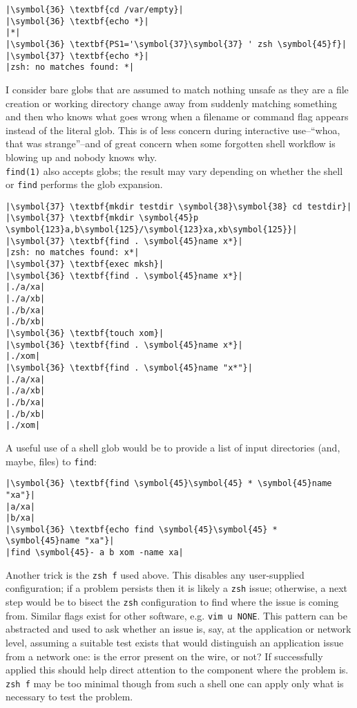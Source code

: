 \documentclass[10pt,a4paper]{article}
\begin{document}
\begin{lstlisting}
|\symbol{36} \textbf{cd /var/empty}|
|\symbol{36} \textbf{echo *}|
|*|
|\symbol{36} \textbf{PS1='\symbol{37}\symbol{37} ' zsh \symbol{45}f}|
|\symbol{37} \textbf{echo *}|
|zsh: no matches found: *|
\end{lstlisting}
 
I consider bare globs that are assumed to match nothing unsafe as they
are a file creation or working directory change away from suddenly
matching something and then who knows what goes wrong when a filename or
command flag appears instead of the literal glob. This is of less
concern during interactive use--``whoa, that was strange''--and of great
concern when some forgotten shell workflow is blowing up and nobody
knows why. \\

\texttt{find(1)} also accepts globs; the result may vary depending on
whether the shell or \texttt{find} performs the glob expansion.

\begin{lstlisting}
|\symbol{37} \textbf{mkdir testdir \symbol{38}\symbol{38} cd testdir}|
|\symbol{37} \textbf{mkdir \symbol{45}p \symbol{123}a,b\symbol{125}/\symbol{123}xa,xb\symbol{125}}|
|\symbol{37} \textbf{find . \symbol{45}name x*}|
|zsh: no matches found: x*|
|\symbol{37} \textbf{exec mksh}|
|\symbol{36} \textbf{find . \symbol{45}name x*}|
|./a/xa|
|./a/xb|
|./b/xa|
|./b/xb|
|\symbol{36} \textbf{touch xom}|
|\symbol{36} \textbf{find . \symbol{45}name x*}|
|./xom|
|\symbol{36} \textbf{find . \symbol{45}name "x*"}|
|./a/xa|
|./a/xb|
|./b/xa|
|./b/xb|
|./xom|
\end{lstlisting}

A useful use of a shell glob would be to provide a list of input
directories (and, maybe, files) to \texttt{find}:

\begin{lstlisting}
|\symbol{36} \textbf{find \symbol{45}\symbol{45} * \symbol{45}name "xa"}|
|a/xa|
|b/xa|
|\symbol{36} \textbf{echo find \symbol{45}\symbol{45} * \symbol{45}name "xa"}|
|find \symbol{45}- a b xom -name xa|
\end{lstlisting}

Another trick is the \texttt{zsh f} used above. This disables
any user-supplied configuration; if a problem persists then it is likely
a \texttt{zsh} issue; otherwise, a next step would be to bisect the
\texttt{zsh} configuration to find where the issue is coming from.
Similar flags exist for other software, e.g. \texttt{vim u
NONE}. This pattern can be abstracted and used to ask whether an issue
is, say, at the application or network level, assuming a suitable test
exists that would distinguish an application issue from a network one:
is the error present on the wire, or not? If successfully applied this
should help direct attention to the component where the problem is.
\texttt{zsh f} may be too minimal though from such a shell
one can apply only what is necessary to test the problem.
\end{document}

